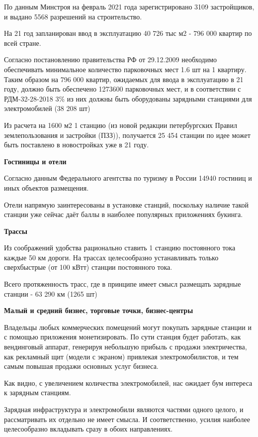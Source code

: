 \documentclass[a4paper,12pt]{report}
\begin{document}
По данным Минстроя на февраль 2021 года зарегистрировано 3109 застройщиков, и выдано 5568 разрешений на строительство.

На 21 год запланирован ввод в эксплуатацию 40 726 тыс м2 - 796 000 квартир по всей стране. 

Согласно постановлению правительства РФ от 29.12.2009 необходимо обеспечивать минимальное количество парковочных мест 1.6 шт на 1 квартиру. Таким образом на 796 000 квартир, ожидаемых для ввода в эксплуатацию в 21 году, должно быть обеспечено 1273600 парковочных мест, и в соответствии с РДМ-32-28-2018 3\% из них должны быть оборудованы зарядными станциями для электромобилей (38 208 шт)

Из расчета на 1600 м2 1 станцию (из новой редакции петербургских Правил землепользования и застройки (ПЗЗ)), получается 25 454 станции по идее может быть поставлено в новостройках уже в 21 году.

\textbf{Гостиницы и отели}

Согласно данным Федерального агентства по туризму в России 14940 гостиниц и иных объектов размещения. 

Отели напрямую заинтересованы в установке станций, поскольку наличие такой станции уже сейчас даёт баллы в наиболее популярных приложениях букинга. 

\textbf{Трассы} 

Из соображений удобства рационально ставить 1 станцию постоянного тока каждые 50 км дороги. На трассах целесообразно устанавливать только сверхбыстрые (от 100 кВтт) станции постоянного тока. 

Всего протяженность трасс, где в принципе имеет смысл размещать зарядные станции  - 63 290 км (1265 шт)

\textbf{Малый и средний бизнес, торговые точки, бизнес-центры}

Владельцы любых коммерческих помещений могут покупать зарядные станции и с помощью приложения монетизировать. По сути станция будет работать, как вендинговый аппарат, генерируя небольшую прибыль с продажи электричества, как рекламный щит (модели с экраном) привлекая электромобилистов, и тем самым повышая продажи основных услуг бизнеса. 

Как видно, с увеличением количества электромобилей, нас ожидает бум интереса к зарядным станциям. 

Зарядная инфраструктура и электромобили являются частями одного целого, и рассматривать их отдельно не имеет смысла. И соответственно, усилия наиболее целесообразно вкладывать сразу в обоих направлениях.  
\end{document}
